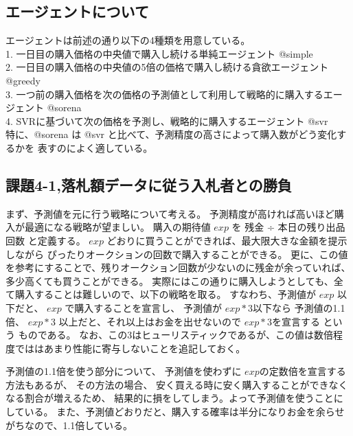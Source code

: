 \documentclass[]{jsarticle}
\begin{document}
\subsection{エージェントについて}
エージェントは前述の通り以下の4種類を用意している。 \\
1. 一日目の購入価格の中央値で購入し続ける単純エージェント @simple \\
2. 一日目の購入価格の中央値の5倍の価格で購入し続ける貪欲エージェント @greedy \\
3. 一つ前の購入価格を次の価格の予測値として利用して戦略的に購入するエージェント @sorena \\
4. SVRに基づいて次の価格を予測し、戦略的に購入するエージェント @svr \\
特に、@sorena は @svr と比べて、予測精度の高さによって購入数がどう変化するかを
表すのによく適している。

\newpage
\subsection{課題4-1,落札額データに従う入札者との勝負}
まず、予測値を元に行う戦略について考える。
予測精度が高ければ高いほど購入が最適になる戦略が望ましい。
購入の期待値 $exp$ を 残金 ÷ 本日の残り出品回数 と定義する。
$exp$ どおりに買うことができれば、最大限大きな金額を提示しながら
ぴったりオークションの回数で購入することができる。
更に、この値を参考にすることで、残りオークション回数が少ないのに残金が余っていれば、
多少高くても買うことができる。
実際にはこの通りに購入しようとしても、全て購入することは難しいので、以下の戦略を取る。
すなわち、予測値が $exp$ 以下だと、 $exp$ で購入することを宣言し、
予測値が $exp * 3$以下なら 予測値の1.1倍、
$ exp * 3 $ 以上だと、それ以上はお金を出せないので $exp*3$を宣言する という
ものである。
なお、この3はヒューリスティックであるが、この値は数倍程度でははあまり性能に寄与しないことを追記しておく。

予測値の1.1倍を使う部分について、
予測値を使わずに $exp$の定数倍を宣言する方法もあるが、
その方法の場合、 安く買える時に安く購入することができなくなる割合が増えるため、
結果的に損をしてしまう。よって予測値を使うことにしている。
また、予測値どおりだと、購入する確率は半分になりお金を余らせがちなので、1.1倍している。

\newpage
\end{document}
